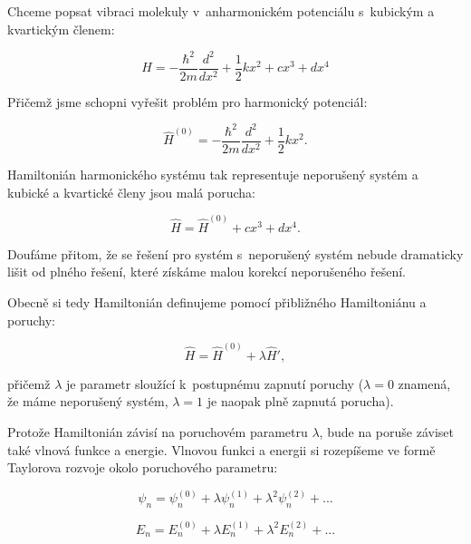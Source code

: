 \begin{priklad} 
Chceme popsat vibraci molekuly v~anharmonickém potenciálu s~kubickým a kvartickým členem:
  
\begin{equation}
\hat{H}=-\frac{\hbar^2}{2m}\frac{d^2}{dx^2}+\frac{1}{2}kx^2+cx^3+dx^4
\nonumber
\end{equation}
 
Přičemž jsme schopni vyřešit problém pro harmonický potenciál:
 
\begin{equation}
\hat{H}^{(0)}=-\frac{\hbar^2}{2m}\frac{d^2}{dx^2}+\frac{1}{2}kx^2.
\nonumber
\end{equation}
 
Hamiltonián harmonického systému tak representuje neporušený systém a kubické a kvartické členy jsou malá porucha:
 
\begin{equation}
\hat{H}=\hat{H}^{(0)}+cx^3+dx^4.
\end{equation}

Doufáme přitom, že se řešení pro systém s~neporušený systém nebude dramaticky lišit od plného řešení, které získáme malou korekcí neporušeného řešení.
\end{priklad}

Obecně si tedy Hamiltonián definujeme pomocí přibližného Hamiltoniánu a poruchy:

\begin{equation}
\hat{H}=\hat{H}^{(0)}+\lambda\hat{H}',
\end{equation}

\noindent přičemž $ \lambda $ je parametr sloužící k~postupnému zapnutí poruchy ($ \lambda = 0 $ znamená, že máme neporušený systém, $ \lambda=1 $ je naopak plně zapnutá porucha).

Protože Hamiltonián závisí na poruchovém parametru $\lambda$, bude na poruše záviset také vlnová funkce a energie. Vlnovou funkci a energii si rozepíšeme ve formě Taylorova rozvoje okolo poruchového parametru:

\begin{equation}
\psi_{n}=\psi^{(0)}_{n}+\lambda \psi^{(1)}_{n}+\lambda^2 \psi^{(2)}_{n}+...
\label{rov:aprox:poruchawf}
\end{equation}

\begin{equation}
E_{n}=E^{(0)}_{n}+\lambda E^{(1)}_{n}+\lambda^2 E^{(2)}_{n}+...
\end{equation}

